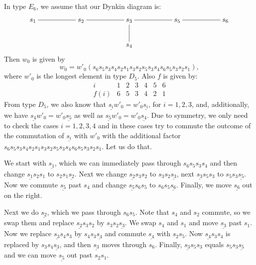 \documentclass[a4paper]{amsart}
\begin{document}
In type $E_6$, we assume that our Dynkin diagram is:
\begin{displaymath}
\xymatrix{s_1\ar@{-}[rr]&&s_2\ar@{-}[rr]&&
s_{3}\ar@{-}[rr]\ar@{-}[d]&&s_{5}\ar@{-}[rr]&&s_{6}\\
&&&&s_{4}&&&&} 
\end{displaymath}
Then $w_0$ is given by 
\begin{displaymath}
w_0=w'_0(s_6 s_5 s_3 s_4 s_2 s_1 s_3 s_2 s_5 s_3 s_4 s_6 s_5 s_3 s_2 s_1),
\end{displaymath}
where $w'_0$ is the longest element in type $D_5$.
Also $f$ is given by:
\begin{displaymath}
\begin{array}{c||c|c|c|c|c|c}
i&1&2&3&4&5&6\\
\hline
f(i)&6&5&3&4&2&1
\end{array}
\end{displaymath}
From type $D_5$, we also know that 
$\underline{s_{i}}w'_0=w'_0\underline{s_{i}}$, for $i=1,2,3$,
and, additionally, we have  
$\underline{s_{4}}w'_0=w'_0\underline{s_{5}}$
as well as $\underline{s_{5}}w'_0=w'_0\underline{s_{4}}$.
Due to symmetry, we only need to check the cases $i=1,2,3,4$
and in these cases try to commute the outcome of the 
commutation of  $\underline{s_{i}}$ with $w'_0$
with the additional factor 
$s_6 s_5 s_3 s_4 s_2 s_1 s_3 s_2 s_5 s_3 s_4 s_6 s_5 s_3 s_2 s_1$.
Let us do that.

We start with $\underline{s_{1}}$, which we can immediately pass
through $s_6 s_5 s_3 s_4$ and then change 
$\underline{s_{1}}s_2 s_1$  to $s_2 s_1 \underline{s_{2}}$.
Next we change $\underline{s_{2}} s_3 s_2$ to
$s_3 s_2 \underline{s_{3}}$, next 
$\underline{s_{3}} s_5 s_3$ to $ s_5 s_3\underline{s_{5}}$.
Now we commute $\underline{s_{5}}$ past $s_4$ and change
$\underline{s_{5}}s_6 s_5$ to $s_6 s_5\underline{s_{6}}$.
Finally, we move $\underline{s_{6}}$ out on the right. 

Next we do $\underline{s_{2}}$, which we pass
through $s_6 s_5$. Note that $s_4$ and $s_2$ commute, so
we swap them and replace 
$\underline{s_{2}}s_3 s_2$  by $s_3 s_2 \underline{s_{3}}$.
We swap $s_4$ and $s_1$ and move  $\underline{s_{3}}$
past $s_1$. Now we replace 
$\underline{s_{3}}s_4 s_3$  by $s_4 s_3 \underline{s_{4}}$
and commute $\underline{s_{4}}$ with $s_2 s_5$.
Now $\underline{s_{4}}s_3 s_4$ is replaced by $s_3 s_4 \underline{s_{3}}$,
and then $\underline{s_{3}}$ moves through $s_6$.
Finally, $\underline{s_{3}} s_5 s_3$ equals
$s_5 s_3\underline{s_{5}}$ and we can move $\underline{s_{5}}$
out past $s_2 s_1$.
\end{document}
